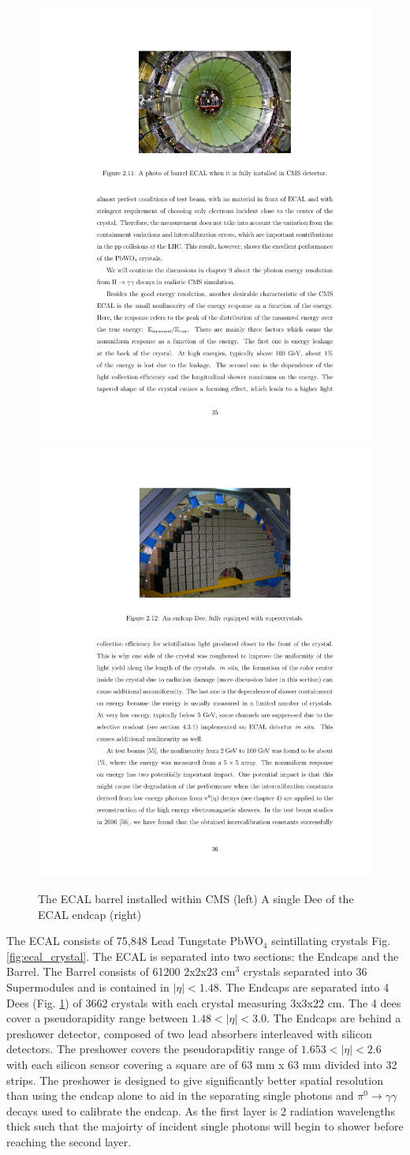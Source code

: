 \begin{figure}
\begin{center}
\includegraphics[width=.45\textwidth]{pics/ecal_barrel}
\includegraphics[width=.45\textwidth]{pics/ecal_dee}
\end{center}
\caption{The ECAL barrel installed within CMS (left) A single Dee of the ECAL endcap (right)}
\label{fig:ecal_photos}
\end{figure}

The ECAL consists of 75,848 Lead Tungstate PbWO$_4$ scintillating crystals Fig. \ref{fig:ecal_crystal}. The ECAL is separated into two sections: the Endcaps and the Barrel. 
The Barrel consists of 61200 2x2x23 cm$^3$ crystals separated into 36 Supermodules  and is contained in $|\eta| < 1.48$. The Endcaps are separated into 4 Dees (Fig. \ref{fig:ecal_photos})
 of 3662 crystals with each crystal measuring 3x3x22 cm. 
The 4 dees cover a  pseudorapidity range between $1.48 < |\eta| < 3.0$.
The Endcaps are behind a preshower detector, composed of two lead absorbers 
interleaved with silicon detectors. The preshower covers the pseudorapditiy range
of $1.653 < |\eta| < 2.6$ with each silicon sensor covering a square are of 
63 mm x 63 mm divided into 32 strips. The preshower is designed to give significantly
better spatial resolution than using the endcap alone to aid in the separating single photons
and $\pi^0 \rightarrow \gamma\gamma$ decays used to calibrate the endcap. As the first layer is
2 radiation wavelengths thick such that the majoirty of incident single photons will  
begin to shower before reaching the second layer.  


